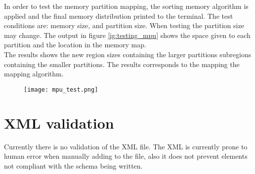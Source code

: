 %
%
In order to test the memory partition mapping,
the sorting memory algorithm is applied and the final memory distribution printed to the terminal.
The test conditions are:
memory size,
and partition size.
When testing the partition size may change.
The output in figure \ref{ig:testing_mpu} shows the space given to each partition and the location
in the memory map.\\
The results shows the new region sizes containing the larger partitions subregions containing the smaller partitions.
The results corresponds to the mapping the mapping algorithm.

\begin{figure}[H]
	\centering\texttt{[image: mpu\_test.png]}
	\label{fig:testing_mpu}
\end{figure}


\section{XML validation}
Currently there is no validation of the XML file.
The XML is currently prone to human error when manually
adding to the file, also it does not prevent elements
not compliant with the schema being written.


